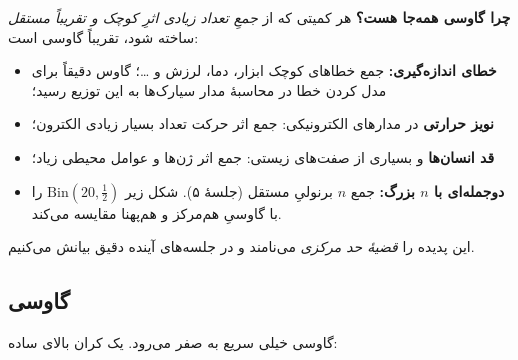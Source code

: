 \begin{intuition}
\textbf{چرا گاوسی همه‌جا هست؟} هر کمیتی که از \emph{جمعِ تعداد زیادی اثرِ کوچک و تقریباً مستقل} ساخته شود، تقریباً گاوسی است:
\begin{itemize}
  \item \textbf{خطای اندازه‌گیری:} جمع خطاهای کوچک ابزار، دما، لرزش و \dots؛ گاوس دقیقاً برای مدل کردن خطا در محاسبهٔ مدار سیارک‌ها به این توزیع رسید؛
  \item \textbf{نویز حرارتی} در مدارهای الکترونیکی: جمع اثر حرکت تعداد بسیار زیادی الکترون؛
  \item \textbf{قد انسان‌ها} و بسیاری از صفت‌های زیستی: جمع اثر ژن‌ها و عوامل محیطی زیاد؛
  \item \textbf{دوجمله‌ای با $n$ بزرگ:} جمع $n$ برنولیِ مستقل (جلسهٔ ۵). شکل زیر $\mathrm{Bin}(20,\tfrac12)$ را با گاوسیِ هم‌مرکز و هم‌پهنا مقایسه می‌کند.
\end{itemize}
این پدیده را \emph{قضیهٔ حد مرکزی} می‌نامند و در جلسه‌های آینده دقیق بیانش می‌کنیم.
\end{intuition}

\begin{figblock}

\end{figblock}

\subsection{ گاوسی}

 گاوسی خیلی سریع به صفر می‌رود. یک کران بالای ساده:


